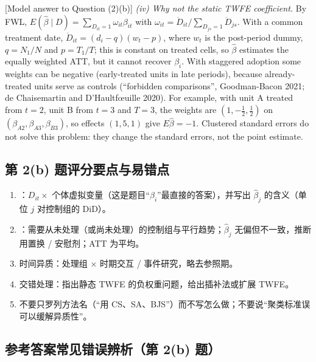 \begin{english}[Model answer to Question (2)(b)]
\textit{(iv) Why not the static TWFE coefficient.} By FWL, $E(\hat\beta\mid D)=\sum_{D_{it}=1}\omega_{it}\beta_{it}$ with $\omega_{it}=\ddot D_{it}/\sum_{D_{js}=1}\ddot D_{js}$. With a common treatment date, $\ddot D_{it}=(d_i-q)(w_t-p)$, where $w_t$ is the post-period dummy, $q=N_1/N$ and $p=T_1/T$; this is constant on treated cells, so $\hat\beta$ estimates the equally weighted ATT, but it cannot recover $\beta_i$. With staggered adoption some weights can be negative (early-treated units in late periods), because already-treated units serve as controls (``forbidden comparisons'', Goodman-Bacon 2021; de Chaisemartin and D'Haultf\oe uille 2020). For example, with unit A treated from $t=2$, unit B from $t=3$ and $T=3$, the weights are $(1,-\frac12,\frac12)$ on $(\beta_{A2},\beta_{A3},\beta_{B3})$, so effects $(1,5,1)$ give $E\hat\beta=-1$. Clustered standard errors do not solve this problem: they change the standard errors, not the point estimate.
\end{english}

\subsection{第 2(b) 题评分要点与易错点}

\begin{keypt}[第 2(b) 题评分要点]
\begin{enumerate}
  \item {}：$D_{it}\times$ 个体虚拟变量（这是题目“$\beta_i$”最直接的答案），并写出 $\hat\beta_j$ 的含义（单位 $j$ 对控制组的 DiD）。
  \item {}：需要从未处理（或尚未处理）的控制组与平行趋势；$\hat\beta_j$ 无偏但不一致，推断用置换 / 安慰剂；ATT 为平均。
  \item 时间异质：处理组 $\times$ 时期交互 / 事件研究，略去参照期。
  \item 交错处理：指出静态 TWFE 的负权重问题，给出插补法或扩展 TWFE。
  \item 不要只罗列方法名（“用 CS、SA、BJS”）而不写怎么做；不要说“聚类标准误可以缓解异质性”。
\end{enumerate}
\end{keypt}

\subsection{参考答案常见错误辨析（第 2(b) 题）}\label{sec:U17b-err2b}

